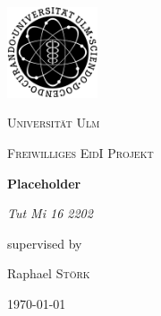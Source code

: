 \documentclass[12pt,a4paper,titlepage,twoside]{article}
\def\blankpage{%
	\clearpage%
	\thispagestyle{empty}%
	\addtocounter{page}{-1}%
	\null%
	\clearpage}
\begin{document}
	\sffamily
	\begin{titlepage}
		\centering
		\includegraphics[width=0.2\textwidth]{res/unilogo_bild}\par\vspace{1cm}
		{\scshape\LARGE Universität Ulm \par}
		\vspace{1cm}
		{\scshape\Large Freiwilliges EidI Projekt \par}
		\vspace{1.5cm}
		{\huge\bfseries Placeholder\par}
		\vspace{2cm}
		{\Large\itshape Tut Mi 16 2202\par}
		\vfill
		supervised by\par
		Raphael \textsc{Störk}
		
		\vfill
		
		{\large \today\par}
	\end{titlepage}
\blankpage

	\begin{abstract}
		In diesem Dokument sind alle wichtigen Prozessschritte, Entscheidungen und Ergebnisse dokumentiert, welche im Verlauf des Projektes 'Placeholder' entstanden sind. Das Projekt selber ist eine eigenständige, frewillige Zusatzleistung der Tutoriumsteilnehmer, welches als Unterstützung der Studenten beim Erlernen wichtiger Grundlagen helfen soll. Das Projekt dient insbesondere NICHT als Pflichtteil der Übung sondern ist ein individuelles Zusatzangebot des Tutors.
		
		[Ergebnisse]
	\end{abstract}
\blankpage
\tableofcontents
\blankpage



\end{document}
